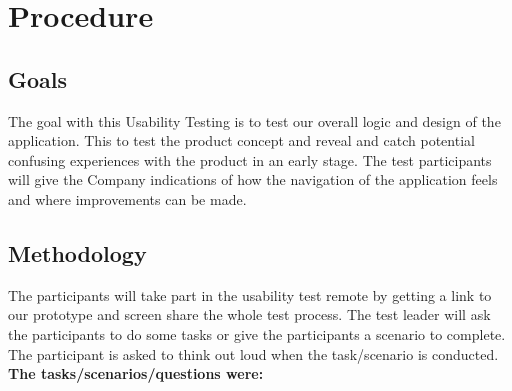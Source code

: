 \chapter{Procedure}
\section{Goals}
The goal with this Usability Testing is to test our overall logic and design of the application. This to test the product concept and reveal and catch potential confusing experiences with the product in an early stage. The test participants will give the Company indications of how the navigation of the application feels and where improvements can be made.
\section{Methodology}
The participants will take part in the usability test remote by getting a link to our prototype and screen share the whole test process. The test leader will ask the participants to do some tasks or give the participants a scenario to complete. The participant is asked to think out loud when the task/scenario is conducted. \\

\noindent\textbf{The tasks/scenarios/questions were:}

